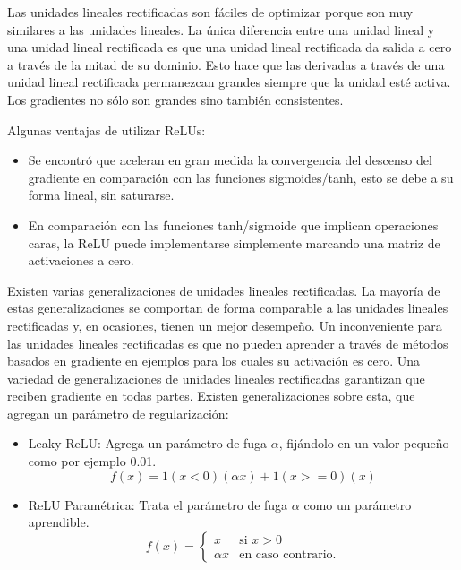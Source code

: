 \documentclass[a4paper,11pt,spanish]{book}
\begin{document}
	    Las unidades lineales rectificadas son fáciles de optimizar porque son muy similares a las unidades lineales.
	    La única diferencia entre una unidad lineal y una unidad lineal rectificada es que una unidad lineal rectificada da salida a cero a través de la mitad de su 
	    dominio.
	    Esto hace que las derivadas a través de una unidad lineal rectificada permanezcan grandes siempre que la unidad esté activa.
	    Los gradientes no sólo son grandes sino también consistentes.

	    Algunas ventajas de utilizar ReLUs:
	    \begin{itemize}
	      \item Se encontró que aceleran en gran medida la convergencia del descenso del gradiente en comparación con las funciones sigmoides/tanh, 
	      esto se debe a su forma lineal, sin saturarse.
	      \item En comparación con las funciones tanh/sigmoide que implican operaciones caras, la ReLU puede implementarse simplemente marcando una matriz de 
	      activaciones a cero.
	    \end{itemize}

	    Existen varias generalizaciones de unidades lineales rectificadas. 
	    La mayoría de estas generalizaciones se comportan de forma comparable a las unidades lineales rectificadas y, en ocasiones, tienen un mejor desempeño. 
	    Un inconveniente para las unidades lineales rectificadas es que no pueden aprender a través de métodos basados ​​en gradiente en ejemplos para los cuales su 
	    activación es cero. 
	    Una variedad de generalizaciones de unidades lineales rectificadas garantizan que reciben gradiente en todas partes. 
	    Existen generalizaciones sobre esta, que agregan un parámetro de regularización:
	    \begin{itemize}
	      \item Leaky ReLU: Agrega un parámetro de fuga $\alpha$, fijándolo en un valor pequeño como por ejemplo 0.01.
		\begin{equation*}
		  f(x)=1(x<0)(\alpha x)+1(x>=0)(x)
		\end{equation*}
	      \item ReLU Paramétrica: Trata el parámetro de fuga $\alpha$ como un parámetro aprendible. 
		\begin{equation*}
		  f(x)= \begin{cases}
			  x & \text{si $x > 0$} \\
			  \alpha x & \text{en caso contrario.}
			\end{cases}
		\end{equation*}
	    \end{itemize}
\end{document}
